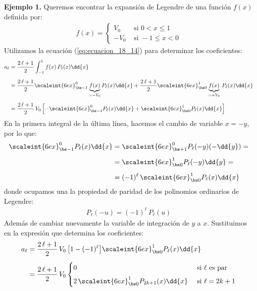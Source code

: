 \textbf{Ejemplo 1.} Queremos encontrar la expansión de Legendre de una función $f (x)$ definida por:
\begin{align*}
f (x) = \begin{cases}
V_{0} & \mbox{ si } 0 < x \leq 1 \\[0.5em]
- V_{0} & \mbox{ si } -1 \leq x < 0
\end{cases}
\end{align*}
Utilizamos la ecuación (\ref{eq:ecuacion_18_14}) para determinar los coeficientes:
\begin{align*}
a_{\ell} &= \dfrac{2 \, \ell + 1}{2} \int_{-1}^{1} f(x) \, P_{\ell} (x) \dd{x} \\[0.5em]
&= \dfrac{2 \, \ell + 1}{2} \scaleint{6ex}_{\bs -1}^{0} \underbrace{f(x)}_{=-V_0}  P_{\ell} (x) \dd{x} + \dfrac{2 \, \ell + 1}{2} \scaleint{6ex}_{\bs 0}^{1} \underbrace{f(x)}_{=+V_0} \, P_{\ell} (x) \dd{x} \\[0.5em]
&= \dfrac{2 \, \ell + 1}{2} \, V_{0} \left[ - \scaleint{6ex}_{\bs -1}^{0} P_{\ell} (x) \dd{x} + \scaleint{6ex}_{\bs 0}^{1} P_{\ell} (x) \dd{x} \right]
\end{align*}
En la primera integral de la última línea, hacemos el cambio de variable $x = -y$, por lo que:
\begin{align*}
\scaleint{6ex}_{\bs -1}^{0} P_{\ell} (x) \dd{x} &= \scaleint{6ex}_{\bs +1}^{0} P_{\ell} (-y) (-\dd{y}) = \\[0.5em]
&= \scaleint{6ex}_{\bs 0}^{1} P_{\ell} (-y) \dd{y} = \\[0.5em]
&= (-1)^{\ell} \, \scaleint{6ex}_{\bs 0}^{1} P_{\ell} (x) \dd{x}
\end{align*}
donde ocupamos una la propiedad de paridad de los polinomios ordinarios de Legendre:
\begin{align*}
P_{\ell} (-u) = (-1)^{\ell} \, P_{\ell} (u)
\end{align*}
Además de cambiar nuevamente la variable de integración de $y$ a $x$. Sustituimos en la expresión que determina los coeficientes:
\begin{align*}
a_{\ell} &= \dfrac{2 \, \ell + 1}{2} \, V_{0} \,  \big[ 1 - (-1)^{\ell} \big] \scaleint{6ex}_{\bs 0}^{1} P_{\ell} (x) \dd{x} \\[0.5em]
&= \dfrac{2 \, \ell + 1}{2} \, V_{0} \begin{cases}
0 & \mbox{ si } \ell \mbox{ es par} \\[0.5em]
2 \, \displaystyle \scaleint{6ex}_{\bs 0}^{1} P_{2k+1} (x) \dd{x} & \mbox{ si } \ell = 2 k + 1 
\end{cases}
\end{align*}
